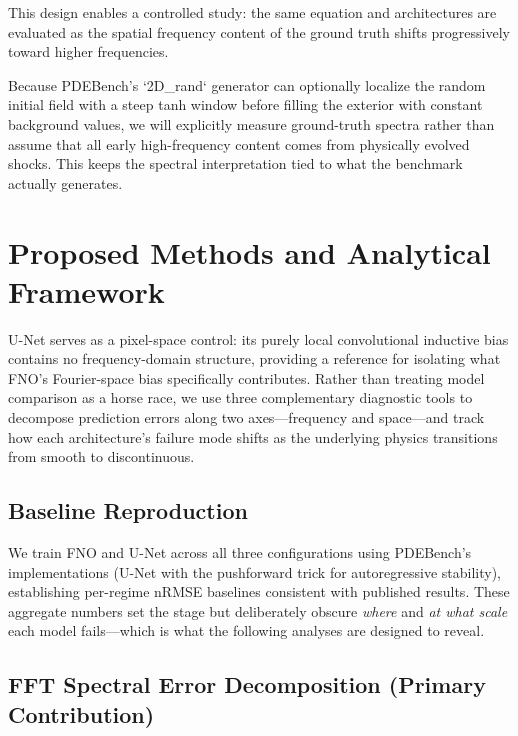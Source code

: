 \documentclass{article}
\begin{document}
This design enables a controlled study: the same equation and architectures are evaluated as the spatial frequency content of the ground truth shifts progressively toward higher frequencies.

Because PDEBench's `2D_rand` generator can optionally localize the random initial field with a steep tanh window before filling the exterior with constant background values, we will explicitly measure ground-truth spectra rather than assume that all early high-frequency content comes from physically evolved shocks. This keeps the spectral interpretation tied to what the benchmark actually generates.

\section*{Proposed Methods and Analytical Framework}

U-Net serves as a pixel-space control: its purely local convolutional inductive bias contains no frequency-domain structure, providing a reference for isolating what FNO's Fourier-space bias specifically contributes. Rather than treating model comparison as a horse race, we use three complementary diagnostic tools to decompose prediction errors along two axes---frequency and space---and track how each architecture's failure mode shifts as the underlying physics transitions from smooth to discontinuous.

\subsection*{Baseline Reproduction}

We train FNO and U-Net across all three configurations using PDEBench's implementations (U-Net with the pushforward trick for autoregressive stability), establishing per-regime nRMSE baselines consistent with published results. These aggregate numbers set the stage but deliberately obscure \emph{where} and \emph{at what scale} each model fails---which is what the following analyses are designed to reveal.

\subsection*{FFT Spectral Error Decomposition (Primary Contribution)}
\end{document}
